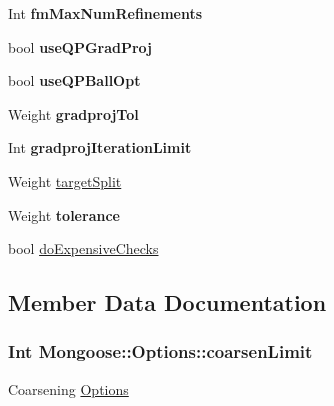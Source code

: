 \begin{DoxyCompactItemize}
\item 
Int {\bfseries fm\+Max\+Num\+Refinements}\hypertarget{struct_mongoose_1_1_options_a6380f2f53f255559a3211bad1bd67453}{}\label{struct_mongoose_1_1_options_a6380f2f53f255559a3211bad1bd67453}

\item 
bool {\bfseries use\+Q\+P\+Grad\+Proj}\hypertarget{struct_mongoose_1_1_options_a7b9626a337262477328da38602500461}{}\label{struct_mongoose_1_1_options_a7b9626a337262477328da38602500461}

\item 
bool {\bfseries use\+Q\+P\+Ball\+Opt}\hypertarget{struct_mongoose_1_1_options_a80ad7f47e8e80398cd89d6d0ec7fa179}{}\label{struct_mongoose_1_1_options_a80ad7f47e8e80398cd89d6d0ec7fa179}

\item 
Weight {\bfseries gradproj\+Tol}\hypertarget{struct_mongoose_1_1_options_a09f4d6649fbbf2e90cdfd674bb2b8082}{}\label{struct_mongoose_1_1_options_a09f4d6649fbbf2e90cdfd674bb2b8082}

\item 
Int {\bfseries gradproj\+Iteration\+Limit}\hypertarget{struct_mongoose_1_1_options_af9a52917b5aea989b27833e81c8c0cf7}{}\label{struct_mongoose_1_1_options_af9a52917b5aea989b27833e81c8c0cf7}

\item 
Weight \hyperlink{struct_mongoose_1_1_options_a26ae6bb0a93bd36a365c472877b6d5e9}{target\+Split}
\item 
Weight {\bfseries tolerance}\hypertarget{struct_mongoose_1_1_options_a4d2c698371dc491e4e52b2d690e9a06e}{}\label{struct_mongoose_1_1_options_a4d2c698371dc491e4e52b2d690e9a06e}

\item 
bool \hyperlink{struct_mongoose_1_1_options_a75794c7e8f81ebc9cf7f7eef07f56eb4}{do\+Expensive\+Checks}
\end{DoxyCompactItemize}


\subsection{Member Data Documentation}
\subsubsection[{\texorpdfstring{coarsen\+Limit}{coarsenLimit}}]{\setlength{\rightskip}{0pt plus 5cm}Int Mongoose\+::\+Options\+::coarsen\+Limit}\hypertarget{struct_mongoose_1_1_options_a240d271ff083f6d841cf8f3ea626dd5a}{}\label{struct_mongoose_1_1_options_a240d271ff083f6d841cf8f3ea626dd5a}
Coarsening \hyperlink{struct_mongoose_1_1_options}{Options} 
